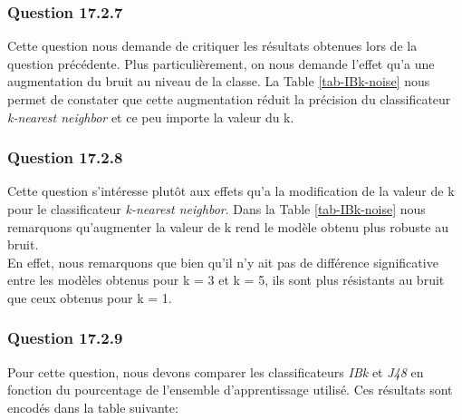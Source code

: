\documentclass[10pt,a4paper]{article}
\begin{document}
			\subsubsection*{Question 17.2.7}
			
				Cette question nous demande de critiquer les résultats obtenues lors de la question précédente. Plus particulièrement, on nous demande l'effet qu'a une augmentation du bruit au niveau de la classe. La Table \ref{tab-IBk-noise} nous permet de constater que cette augmentation réduit la précision du classificateur \textit{k-nearest neighbor} et ce peu importe la valeur du k.
				
				\subsubsection*{Question 17.2.8}
				
				Cette question s'intéresse plutôt aux effets qu'a la modification de la valeur de k pour le classificateur \textit{k-nearest neighbor}. Dans la Table \ref{tab-IBk-noise} nous remarquons qu'augmenter la valeur de k rend le modèle obtenu plus robuste au bruit.\\
				
				En effet, nous remarquons que bien qu'il n'y ait pas de différence significative entre les modèles obtenus pour k = 3 et k = 5, ils sont plus résistants au bruit que ceux obtenus pour k = 1.
				
			\newpage
				
			\subsubsection*{Question 17.2.9}
				Pour cette question, nous devons comparer les classificateurs \textit{IBk} et \textit{J48} en fonction du pourcentage de l'ensemble d'apprentissage utilisé. Ces résultats sont encodés dans la table suivante:
			
\end{document}
